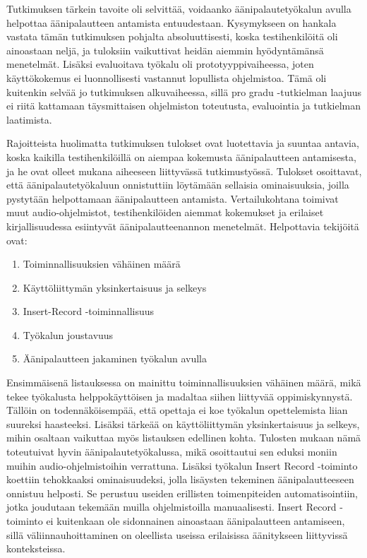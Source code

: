 \documentclass[utf8]{gradu3}
\begin{document}
Tutkimuksen tärkein tavoite oli selvittää, voidaanko äänipalautetyökalun avulla helpottaa äänipalautteen antamista entuudestaan. Kysymykseen on hankala vastata tämän tutkimuksen pohjalta absoluuttisesti, koska testihenkilöitä oli ainoastaan neljä, ja tuloksiin vaikuttivat heidän aiemmin hyödyntämänsä menetelmät. Lisäksi evaluoitava työkalu oli prototyyppivaiheessa, joten käyttökokemus ei luonnollisesti vastannut lopullista ohjelmistoa. Tämä oli kuitenkin selvää jo tutkimuksen alkuvaiheessa, sillä pro gradu -tutkielman laajuus ei riitä kattamaan täysmittaisen ohjelmiston toteutusta, evaluointia ja tutkielman laatimista. 

Rajoitteista huolimatta tutkimuksen tulokset ovat luotettavia ja suuntaa antavia, koska kaikilla testihenkilöillä on aiempaa kokemusta äänipalautteen antamisesta, ja he ovat olleet mukana aiheeseen liittyvässä tutkimustyössä. Tulokset osoittavat, että äänipalautetyökaluun onnistuttiin löytämään sellaisia ominaisuuksia, joilla pystytään helpottamaan äänipalautteen antamista. Vertailukohtana toimivat muut audio-ohjelmistot, testihenkilöiden aiemmat kokemukset ja erilaiset kirjallisuudessa esiintyvät äänipalautteenannon menetelmät. Helpottavia tekijöitä ovat:

\begin{enumerate}
  \item Toiminnallisuuksien vähäinen määrä
  \item Käyttöliittymän yksinkertaisuus ja selkeys
  \item Insert-Record -toiminnallisuus
  \item Työkalun joustavuus
  \item Äänipalautteen jakaminen työkalun avulla
\end{enumerate}

Ensimmäisenä listauksessa on mainittu toiminnallisuuksien vähäinen määrä, mikä tekee työkalusta helppokäyttöisen ja madaltaa siihen liittyvää oppimiskynnystä. Tällöin on todennäköisempää, että opettaja ei koe työkalun opettelemista liian suureksi haasteeksi. Lisäksi tärkeää on käyttöliittymän yksinkertaisuus ja selkeys, mihin osaltaan vaikuttaa myös listauksen edellinen kohta. Tulosten mukaan nämä toteutuivat hyvin äänipalautetyökalussa, mikä osoittautui sen eduksi moniin muihin audio-ohjelmistoihin verrattuna. Lisäksi työkalun Insert Record -toiminto koettiin tehokkaaksi ominaisuudeksi, jolla lisäysten tekeminen äänipalautteeseen onnistuu helposti. Se perustuu useiden erillisten toimenpiteiden automatisointiin, jotka joudutaan tekemään muilla ohjelmistoilla manuaalisesti. Insert Record -toiminto ei kuitenkaan ole sidonnainen ainoastaan äänipalautteen antamiseen, sillä väliinnauhoittaminen on oleellista useissa erilaisissa äänitykseen liittyvissä konteksteissa. 
\end{document}

